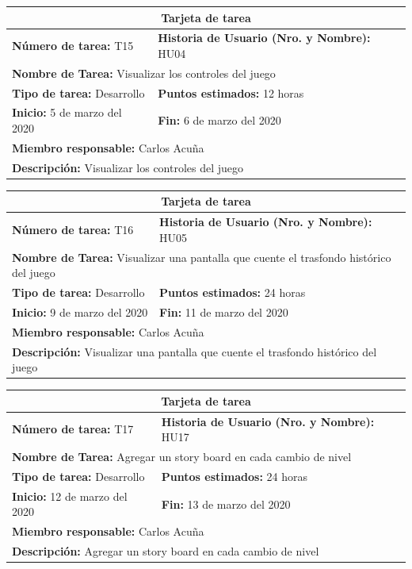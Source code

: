 \documentclass[a4paper, openright, 12pt]{report}
\begin{document}
\begin{longtable}{| p{6cm} | p{6cm} |}
\hline
\multicolumn{2}{|c|}{\textbf{Tarjeta de tarea}} \\
\hline
\textbf{Número de tarea:} T15 & \textbf{Historia de Usuario (Nro. y Nombre):} HU04\\
\hline
\multicolumn{2}{|p{12cm}|}{\textbf{Nombre de Tarea:} Visualizar los controles del juego} \\ \hline
\textbf{Tipo de tarea:} Desarrollo & \textbf{Puntos estimados:} 12 horas  \\ \hline
\textbf{Inicio:} 5 de marzo del 2020 & \textbf{Fin:} 6 de marzo del 2020 \\ \hline
\multicolumn{2}{|p{12cm}|}{\textbf{Miembro responsable:} Carlos Acuña} \\ \hline
\multicolumn{2}{|p{12cm}|}{\textbf{Descripción:} Visualizar los controles del juego} \\ \hline
\end{longtable}
\clearpage
\begin{longtable}{| p{6cm} | p{6cm} |}
\hline
\multicolumn{2}{|c|}{\textbf{Tarjeta de tarea}} \\
\hline
\textbf{Número de tarea:} T16 & \textbf{Historia de Usuario (Nro. y Nombre):} HU05\\
\hline
\multicolumn{2}{|p{12cm}|}{\textbf{Nombre de Tarea:} Visualizar una pantalla que
cuente el trasfondo histórico del juego} \\ \hline
\textbf{Tipo de tarea:} Desarrollo & \textbf{Puntos estimados:} 24 horas  \\ \hline
\textbf{Inicio:} 9 de marzo del 2020 & \textbf{Fin:} 11 de marzo del 2020 \\ \hline
\multicolumn{2}{|p{12cm}|}{\textbf{Miembro responsable:} Carlos Acuña} \\ \hline
\multicolumn{2}{|p{12cm}|}{\textbf{Descripción:} Visualizar una pantalla que
cuente el trasfondo histórico del juego} \\ \hline
\end{longtable}

\begin{longtable}{| p{6cm} | p{6cm} |}
\hline
\multicolumn{2}{|c|}{\textbf{Tarjeta de tarea}} \\
\hline
\textbf{Número de tarea:} T17 & \textbf{Historia de Usuario (Nro. y Nombre):} HU17\\
\hline
\multicolumn{2}{|p{12cm}|}{\textbf{Nombre de Tarea:} Agregar un story board en
cada cambio de nivel} \\ \hline
\textbf{Tipo de tarea:} Desarrollo & \textbf{Puntos estimados:} 24 horas  \\ \hline
\textbf{Inicio:} 12 de marzo del 2020 & \textbf{Fin:} 13 de marzo del 2020 \\ \hline
\multicolumn{2}{|p{12cm}|}{\textbf{Miembro responsable:} Carlos Acuña} \\ \hline
\multicolumn{2}{|p{12cm}|}{\textbf{Descripción:} Agregar un story board en
cada cambio de nivel} \\ \hline
\end{longtable}

\thispagestyle{empty}
\end{document}
